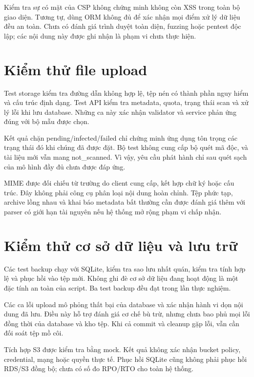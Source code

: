 Kiểm tra sự có mặt của CSP không chứng minh không còn XSS trong toàn bộ giao diện. Tương tự, dùng ORM không đủ để xác nhận mọi điểm xử lý dữ liệu đều an toàn. Chưa có đánh giá trình duyệt toàn diện, fuzzing hoặc pentest độc lập; các nội dung này được ghi nhận là phạm vi chưa thực hiện.

\section{Kiểm thử file upload}
Test storage kiểm tra đường dẫn không hợp lệ, tệp nén có thành phần nguy hiểm và cấu trúc định dạng. Test API kiểm tra metadata, quota, trạng thái scan và xử lý lỗi khi lưu database. Những ca này xác nhận validator và service phản ứng đúng với bộ mẫu được chọn.

Kết quả chặn pending/infected/failed chỉ chứng minh ứng dụng tôn trọng các trạng thái đó khi chúng đã được đặt. Bộ test không cung cấp bộ quét mã độc, và tài liệu mới vẫn mang not\_scanned. Vì vậy, yêu cầu phát hành chỉ sau quét sạch của mô hình đầy đủ chưa được đáp ứng.

MIME được đối chiếu từ trường do client cung cấp, kết hợp chữ ký hoặc cấu trúc. Đây không phải công cụ phân loại nội dung hoàn chỉnh. Tệp phức tạp, archive lồng nhau và khai báo metadata bất thường cần được đánh giá thêm với parser có giới hạn tài nguyên nếu hệ thống mở rộng phạm vi chấp nhận.

\section{Kiểm thử cơ sở dữ liệu và lưu trữ}
Các test backup chạy với SQLite, kiểm tra sao lưu nhất quán, kiểm tra tính hợp lệ và phục hồi vào tệp mới. Không ghi đè cơ sở dữ liệu đang hoạt động là một đặc tính an toàn của script. Ba test backup đều đạt trong lần thực nghiệm.

Các ca lỗi upload mô phỏng thất bại của database và xác nhận hành vi dọn nội dung đã lưu. Điều này hỗ trợ đánh giá cơ chế bù trừ, nhưng chưa bao phủ mọi lỗi đồng thời của database và kho tệp. Khi cả commit và cleanup gặp lỗi, vẫn cần đối soát tệp mồ côi.

Tích hợp S3 được kiểm tra bằng mock. Kết quả không xác nhận bucket policy, credential, mạng hoặc quyền thực tế. Phục hồi SQLite cũng không phải phục hồi RDS/S3 đồng bộ; chưa có số đo RPO/RTO cho toàn hệ thống.

